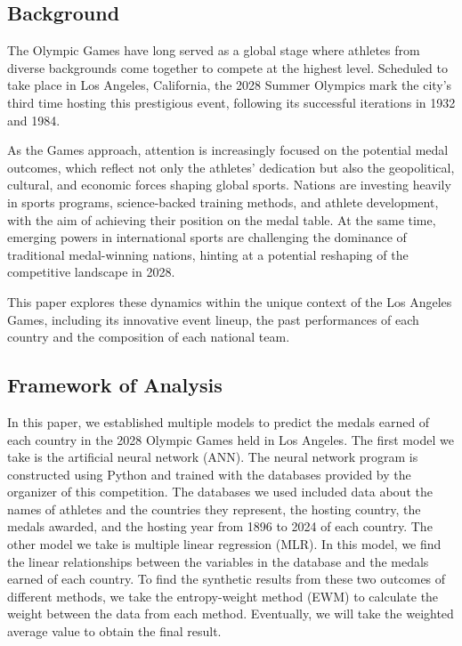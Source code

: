 \documentclass{mcmthesis}
\begin{document}
\subsection{Background}

The Olympic Games have long served as a global stage where athletes from diverse backgrounds come together to compete at the highest level. Scheduled to take place in Los Angeles, California, the 2028 Summer Olympics mark the city’s third time hosting this prestigious event, following its successful iterations in 1932 and 1984.

As the Games approach, attention is increasingly focused on the potential medal outcomes, which reflect not only the athletes’ dedication but also the geopolitical, cultural, and economic forces shaping global sports. Nations are investing heavily in sports programs, science-backed training methods, and athlete development, with the aim of achieving their position on the medal table. At the same time, emerging powers in international sports are challenging the dominance of traditional medal-winning nations, hinting at a potential reshaping of the competitive landscape in 2028.

This paper explores these dynamics within the unique context of the Los Angeles Games, including its innovative event lineup, the past performances of each country and the composition of each national team.

\subsection{Framework of Analysis}
In this paper, we established multiple models to predict the medals earned of each country in the 2028 Olympic Games held in Los Angeles. The first model we take is the artificial neural network (ANN). The neural network program is constructed using Python and trained with the databases provided by the organizer of this competition. The databases we used included data about the names of athletes and the countries they represent, the hosting country, the medals awarded, and the hosting year from 1896 to 2024 of each country. The other model we take is multiple linear regression (MLR). In this model, we find the linear relationships between the variables in the database and the medals earned of each country. To find the synthetic results from these two outcomes of different methods, we take the entropy-weight method (EWM) to calculate the weight between the data from each method. Eventually, we will take the weighted average value to obtain the final result.  
\end{document}
